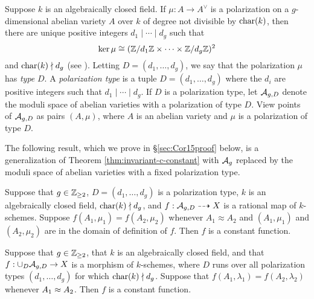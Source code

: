 \documentclass{amsart}
\begin{document}
Suppose $k$ is an algebraically closed field. If $\mu: A \to A^\vee$ is a polarization on a $g$-dimensional abelian variety $A$ over $k$ of degree not divisible by $\operatorname{char}(k)$, then there are unique positive integers $d_1 \mid \cdots \mid d_g$ such that
\[
  \ker \mu \cong (\mathbb{Z}/d_1\mathbb{Z} \times \cdots \times \mathbb{Z}/d_g\mathbb{Z})^2
\]
and $\operatorname{char}(k) \nmid d_g$ (see \cite[Theorem 1 et seq.]{mumford1966}). Letting $D = (d_1, \ldots, d_g)$, we say that the polarization $\mu$ has \emph{type} $D$.
A \emph{polarization type} is a tuple ${D} = (d_1, \ldots, d_g)$ where the $d_i$ are positive integers such that $d_1 \mid \cdots \mid d_g$. If $D$ is a polarization type, let $\mathcal{A}_{g,{D}}$ denote the moduli space of abelian varieties with a polarization of type ${D}$. View points of $\mathcal{A}_{g,{D}}$ as pairs $(A,\mu)$, where $A$ is an abelian variety and $\mu$ is a polarization of type ${D}$.

The following result, which we prove in \S\ref{sec:Cor15proof} below, is a generalization of Theorem \ref{thm:invariant-c-constant} with $\mathcal{A}_g$ replaced by the moduli space of  abelian varieties with a fixed %
polarization type.

\begin{corollary}\label{cor:agpol}
  Suppose that $g \in \mathbb{Z}_{\geq 2}$, ${D} = (d_1, \ldots, d_g)$ is a polarization type, $k$ is an algebraically closed field, $\operatorname{char}(k) \nmid d_g$, and  $f: \mathcal{A}_{g,{D}} \dashrightarrow X$ is a rational map of $k$-schemes. Suppose $f(A_1, \mu_1) = f(A_2, \mu_2)$ whenever $A_1 \approx A_2$ and $(A_1,\mu_1)$ and $(A_2,\mu_2)$ are in the domain of definition of $f$. Then $f$ is a constant function.
\end{corollary}

\begin{corollary}
\label{cor:alldcor}
  Suppose that $g\in\mathbb{Z}_{\ge 2}$, that $k$ is an algebraically closed field, and that $f: \cup_{D} \mathcal{A}_{g,{D}} \to X$ is a morphism of $k$-schemes, where $D$ runs over all polarization types $(d_1, \ldots, d_g)$ for which $\operatorname{char}(k) \nmid d_g$. Suppose that $f(A_1,\lambda_1) = f(A_2,\lambda_2)$ whenever $A_1 \approx A_2$. Then $f$ is a constant function.
\end{corollary}

\end{document}
